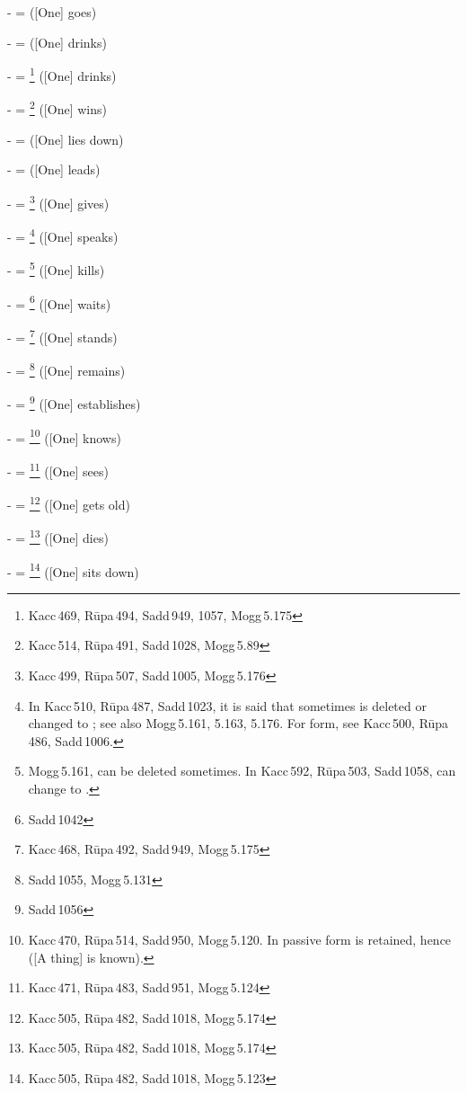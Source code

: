 -  =  ([One] goes)\par
-  =  ([One] drinks)\par
-  = \footnote{Kacc\,469, R\=upa\,494, Sadd\,949, 1057, Mogg\,5.175} ([One] drinks)\par
-  = \footnote{Kacc\,514, R\=upa\,491, Sadd\,1028, Mogg\,5.89} ([One] wins)\par
-  =  ([One] lies down)\par
-  =  ([One] leads)\par
-  = \footnote{Kacc\,499, R\=upa\,507, Sadd\,1005, Mogg\,5.176} ([One] gives)\par
-  = \footnote{In Kacc\,510, R\=upa\,487, Sadd\,1023, it is said that sometimes  is deleted or changed to ; see also Mogg\,5.161, 5.163, 5.176. For  form, see Kacc\,500, R\=upa\,486, Sadd\,1006.} ([One] speaks)\par
-  = \footnote{Mogg\,5.161,  can be deleted sometimes. In Kacc\,592, R\=upa\,503, Sadd\,1058,  can change to .} ([One] kills)\par
-  = \footnote{Sadd\,1042} ([One] waits)\par
-  = \footnote{Kacc\,468, R\=upa\,492, Sadd\,949, Mogg\,5.175} ([One] stands)\par
-  = \footnote{Sadd\,1055, Mogg\,5.131} ([One] remains)\par
-  = \footnote{Sadd\,1056} ([One] establishes)\par
-  = \footnote{Kacc\,470, R\=upa\,514, Sadd\,950, Mogg\,5.120. In passive form  is retained, hence  ([A thing] is known).} ([One] knows)\par
-  = \footnote{Kacc\,471, R\=upa\,483, Sadd\,951, Mogg\,5.124} ([One] sees)\par
-  = \footnote{Kacc\,505, R\=upa\,482, Sadd\,1018, Mogg\,5.174} ([One] gets old)\par
-  = \footnote{Kacc\,505, R\=upa\,482, Sadd\,1018, Mogg\,5.174} ([One] dies)\par
-  = \footnote{Kacc\,505, R\=upa\,482, Sadd\,1018, Mogg\,5.123} ([One] sits down)\par

